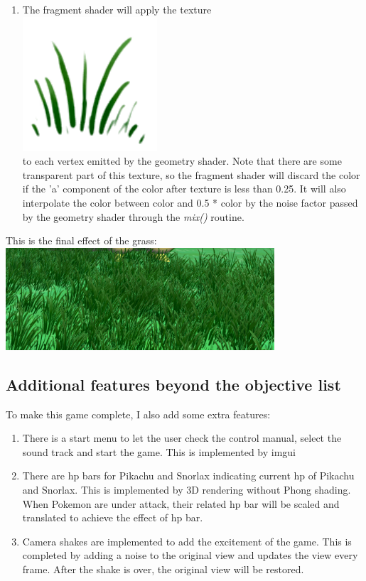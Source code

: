 \documentclass {article}
\begin{document}
\begin{enumerate}
    \item The fragment shader will apply the texture  \\
    \includegraphics[width=50mm]{grass_texture.png} \\
    to each vertex emitted by the geometry shader. Note that there are some transparent part of this texture, so the fragment shader will discard the color if the 'a' component
    of the color after texture is less than 0.25. It will also interpolate the color between color and 0.5 * color by the noise factor passed by the geometry shader through the \textit{mix()} routine.
\end{enumerate}
This is the final effect of the grass: \\
\includegraphics[width=100mm]{effect_grass.png}

\subsection{Additional features beyond the objective list}
To make this game complete, I also add some extra features:
\begin{enumerate}
    \item There is a start menu to let the user check the control manual, select the sound track and start the game. This is implemented by imgui
    \item There are hp bars for Pikachu and Snorlax indicating current hp of Pikachu and Snorlax. This is implemented by 3D rendering without Phong shading.
    When Pokemon are under attack, their related hp bar will be scaled and translated to achieve the effect of hp bar.
    \item Camera shakes are implemented to add the excitement of the game. This is completed by adding a noise to the original view and updates the view every frame.
    After the shake is over, the original view will be restored.
\end{enumerate}
\end{document}
